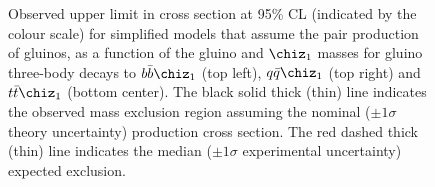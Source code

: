 \begin{figure}[thp!]
\begin{center}
    \caption{Observed upper limit in cross section at 95\% CL
      (indicated by the colour scale) for simplified models that
      assume the pair production of gluinos, as a function of the
      gluino and $\chiz_{1}$ masses for gluino three-body decays to
      $b\bar{b}\chiz_{1}$ (top left), $q\bar{q}\chiz_{1}$ (top right) and $t\bar{t}\chiz_{1}$ (bottom center). 
      The black solid thick (thin) line indicates the observed mass
      exclusion region assuming the nominal (${\pm}1 \sigma$ theory
      uncertainty) production cross section. The red dashed thick
      (thin) line indicates the median (${\pm}1 \sigma$ experimental
      uncertainty) expected exclusion.
      \label{fig:limits-sms} }
  \end{center}
\end{figure}

\clearpage
